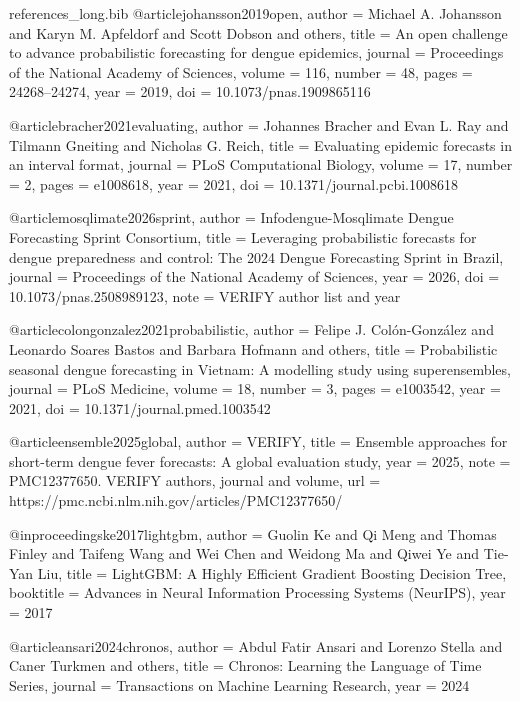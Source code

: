 \begin{filecontents*}[overwrite]{references_long.bib}
@article{johansson2019open,
  author  = {Michael A. Johansson and Karyn M. Apfeldorf and Scott Dobson and others},
  title   = {An open challenge to advance probabilistic forecasting for dengue epidemics},
  journal = {Proceedings of the National Academy of Sciences},
  volume  = {116},
  number  = {48},
  pages   = {24268--24274},
  year    = {2019},
  doi     = {10.1073/pnas.1909865116}
}

@article{bracher2021evaluating,
  author  = {Johannes Bracher and Evan L. Ray and Tilmann Gneiting and Nicholas G. Reich},
  title   = {Evaluating epidemic forecasts in an interval format},
  journal = {PLoS Computational Biology},
  volume  = {17},
  number  = {2},
  pages   = {e1008618},
  year    = {2021},
  doi     = {10.1371/journal.pcbi.1008618}
}

@article{mosqlimate2026sprint,
  author  = {{Infodengue-Mosqlimate Dengue Forecasting Sprint Consortium}},
  title   = {Leveraging probabilistic forecasts for dengue preparedness and control: The 2024 Dengue Forecasting Sprint in {Brazil}},
  journal = {Proceedings of the National Academy of Sciences},
  year    = {2026},
  doi     = {10.1073/pnas.2508989123},
  note    = {VERIFY author list and year}
}

@article{colongonzalez2021probabilistic,
  author  = {Felipe J. Col{\'o}n-Gonz{\'a}lez and Leonardo Soares Bastos and Barbara Hofmann and others},
  title   = {Probabilistic seasonal dengue forecasting in {Vietnam}: A modelling study using superensembles},
  journal = {PLoS Medicine},
  volume  = {18},
  number  = {3},
  pages   = {e1003542},
  year    = {2021},
  doi     = {10.1371/journal.pmed.1003542}
}

@article{ensemble2025global,
  author  = {{VERIFY}},
  title   = {Ensemble approaches for short-term dengue fever forecasts: A global evaluation study},
  year    = {2025},
  note    = {PMC12377650. VERIFY authors, journal and volume},
  url     = {https://pmc.ncbi.nlm.nih.gov/articles/PMC12377650/}
}

@inproceedings{ke2017lightgbm,
  author    = {Guolin Ke and Qi Meng and Thomas Finley and Taifeng Wang and Wei Chen and Weidong Ma and Qiwei Ye and Tie-Yan Liu},
  title     = {{LightGBM}: A Highly Efficient Gradient Boosting Decision Tree},
  booktitle = {Advances in Neural Information Processing Systems (NeurIPS)},
  year      = {2017}
}

@article{ansari2024chronos,
  author  = {Abdul Fatir Ansari and Lorenzo Stella and Caner Turkmen and others},
  title   = {Chronos: Learning the Language of Time Series},
  journal = {Transactions on Machine Learning Research},
  year    = {2024}
}


\end{filecontents*}
